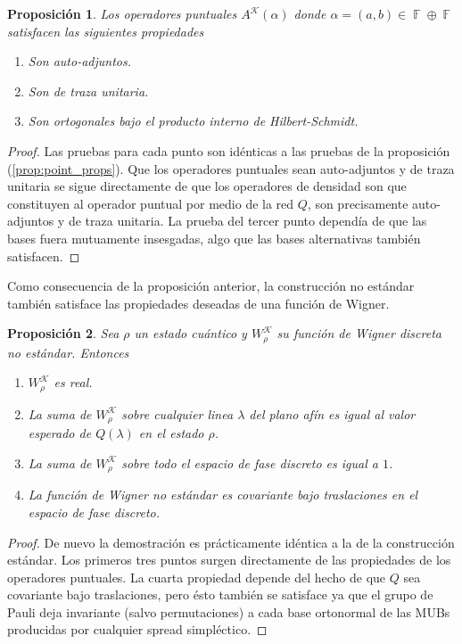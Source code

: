 \documentclass[a4paper]{report}
\DeclareMathOperator{\F}{\mathbb{F}}
\newtheorem{proposition}{Proposición}
\begin{document}
  \begin{proposition}
    Los operadores puntuales $A^{\mathcal K}(\alpha)$ donde
    $\alpha = (a,b) \in \F \oplus \F$ satisfacen las
    siguientes propiedades
    \begin{enumerate}
      \item Son auto-adjuntos.
      \item Son de traza unitaria.
      \item Son ortogonales bajo el producto interno de
        Hilbert-Schmidt.
    \end{enumerate}
  \end{proposition}
  \begin{proof}
    Las pruebas para cada punto son idénticas a las pruebas
    de la proposición (\ref{prop:point_props}). Que los
    operadores puntuales sean auto-adjuntos y de traza
    unitaria se sigue directamente de que los operadores de
    densidad son que constituyen al operador puntual por
    medio de la red $Q$, son precisamente auto-adjuntos y de
    traza unitaria. La prueba del tercer punto dependía de
    que las bases fuera mutuamente insesgadas, algo que las
    bases alternativas también satisfacen.
  \end{proof}
  Como consecuencia de la proposición anterior, la
  construcción no estándar también satisface las propiedades
  deseadas de una función de Wigner.
  \begin{proposition}
    Sea $\rho$ un estado cuántico y $W_\rho^{\mathcal K}$ su
    función de Wigner discreta no estándar. Entonces
    \begin{enumerate}
      \item $W_\rho^{\mathcal K}$ es real.
      \item La suma de $W_\rho^{\mathcal K}$ sobre cualquier
        linea $\lambda$ del plano afín es igual al valor
        esperado de $Q(\lambda)$ en el estado $\rho$.
      \item La suma de $W_\rho^{\mathcal K}$ sobre todo el
        espacio de fase discreto es igual a $1$.
      \item La función de Wigner no estándar es covariante
        bajo traslaciones en el espacio de fase discreto.
    \end{enumerate}
  \end{proposition}
  \begin{proof}
    De nuevo la demostración es prácticamente idéntica a la
    de la construcción estándar. Los primeros tres puntos
    surgen directamente de las propiedades de los operadores
    puntuales. La cuarta propiedad depende del hecho de que
    $Q$ sea covariante bajo traslaciones, pero ésto también
    se satisface ya que el grupo de Pauli deja invariante
    (salvo permutaciones) a cada base ortonormal de las MUBs
    producidas por cualquier spread simpléctico.
  \end{proof}
\end{document}

